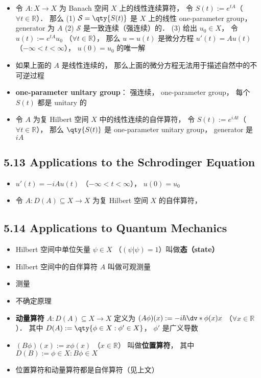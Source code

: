 \begin{itemize}
\item 令 $A:X\to X$ 为 Banach 空间 $X$ 上的线性连续算符， 令 $S(t) := e^{tA}$（$\forall t\in\mathbb R$）． 那么 (1) $\mathcal S = \qty{S(t)}$ 是 $X$ 上的线性 one-parameter group， generator 为 $A$ (2) $\mathcal S$ 是一致连续（强连续）的． (3) 给出 $u_0 \in X$， 令 $u(t) := e^{tA} u_0$ （$\forall t\in\mathbb R$）， 那么 $u = u(t)$ 是微分方程 $u'(t) = Au(t)$ （$-\infty<t<\infty$）， $u(0) = u_0$ 的唯一解

\item 如果上面的 $A$ 是线性连续的， 那么上面的微分方程无法用于描述自然中的不可逆过程

\item \textbf{one-parameter unitary group}： 强连续， one-parameter group， 每个 $S(t)$ 都是 unitary 的

\item 令 $A$ 为复 Hilbert 空间 $X$ 中的线性连续的自伴算符， 令 $S(t) := e^{iAt}$（$\forall t\in\mathbb R$）， 那么 $\qty{S(t)}$ 是 one-parameter unitary group， generator 是 $iA$
\end{itemize}

\subsection{5.13 Applications to the Schrodinger Equation}
\begin{itemize}
\item $u'(t) = -iAu(t)$ （$-\infty<t<\infty$）， $u(0) = u_0$

\item 令 $A:D(A) \subseteq X\to X$ 为复 Hilbert 空间 $X$ 的自伴算符， 
\end{itemize}


\subsection{5.14 Applications to Quantum Mechanics}
\begin{itemize}
\item Hilbert 空间中单位矢量 $\psi\in X$ （$(\psi|\psi)=1$）叫做\textbf{态（state）}

\item Hilbert 空间中的自伴算符 $A$ 叫做可观测量

\item 测量

\item 不确定原理

\item \textbf{动量算符} $A:D(A)\subseteq X\to X$ 定义为 $(A\phi)(x) := -i\hbar \dv*{\phi(x)}{x}$ （$\forall x\in\mathbb R$）． 其中 $D(A) := \qty{\phi\in X: \phi'\in X}$， $\phi'$ 是广义导数

\item $(B\phi)(x) := x\phi(x)$ （$x\in\mathbb R$） 叫做\textbf{位置算符}， 其中 $D(B) := {\phi\in X: B\phi\in X}$

\item 位置算符和动量算符都是自伴算符（见上文）
\end{itemize}

